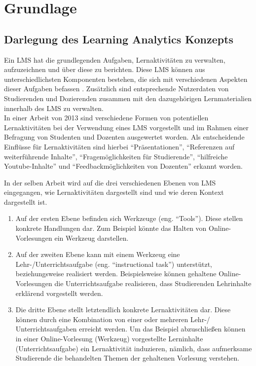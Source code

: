 \chapter{Grundlage}
\section{Darlegung des Learning Analytics Konzepts}

Ein \ac{LMS} hat die grundlegenden Aufgaben, Lernaktivitäten zu verwalten, aufzuzeichnen und über diese zu berichten. Diese \ac{LMS} können aus unterschiedlichsten Komponenten bestehen, die sich mit verschiedenen Aspekten dieser Aufgaben befassen \autocite[S.1]{learningManagementSystemsFieldGuide}. Zusätzlich sind entsprechende Nutzerdaten von Studierenden und Dozierenden zusammen mit den dazugehörigen Lernmaterialien innerhalb des \ac{LMS} zu verwalten. \autocite{learningManagementSystemDefinition}\\
In einer Arbeit von 2013 \autocite[S.253]{SCHOONENBOOM2014247} sind verschiedene Formen von potentiellen Lernaktivitäten bei der Verwendung eines \ac{LMS} vorgestellt und im Rahmen einer Befragung von Studenten und Dozenten ausgewertet worden. Als entscheidende Einflüsse für Lernaktivitäten sind hierbei \enquote{Präsentationen}, \enquote{Referenzen auf weiterführende Inhalte}, \enquote{Fragemöglichkeiten für Studierende}, \enquote{hilfreiche Youtube-Inhalte} und \enquote{Feedbackmöglichkeiten von Dozenten} erkannt worden.

In der selben Arbeit \autocite[S.247]{SCHOONENBOOM2014247} wird auf die drei verschiedenen Ebenen von \ac{LMS} eingegangen, wie Lernaktivitäten dargestellt sind und wie deren Kontext dargestellt ist.
\begin{enumerate}
	\item Auf der ersten Ebene befinden sich Werkzeuge (eng. \enquote{Tools}). Diese stellen konkrete Handlungen dar. Zum Beispiel könnte das Halten von Online-Vorlesungen ein Werkzeug darstellen.
	\item Auf der zweiten Ebene kann mit einem Werkzeug eine Lehr-/Unterrichtsaufgabe (eng. \enquote{instructional task}) unterstützt, beziehungsweise realisiert werden. Beispielsweise können gehaltene Online-Vorlesungen die Unterrichtsaufgabe realisieren, dass Studierenden Lehrinhalte erklärend vorgestellt werden.
	\item Die dritte Ebene stellt letztendlich konkrete Lernaktivitäten dar. Diese können durch eine Kombination von einer oder mehreren Lehr-/ Unterrichtsaufgaben erreicht werden. Um das Beispiel abzuschließen können in einer Online-Vorlesung (Werkzeug) vorgestellte Lerninhalte (Unterrichtsaufgabe) ein Lernaktivität induzieren, nämlich, dass aufmerksame Studierende die behandelten Themen der gehaltenen Vorlesung verstehen.	
\end{enumerate}

